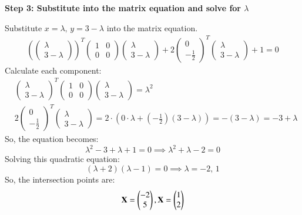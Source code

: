 \documentclass[journal,12pt,onecolumn]{IEEEtran}
\begin{document}
\textbf{Step 3: Substitute into the matrix equation and solve for \(\lambda\)}

Substitute \( x = \lambda,\, y = 3 - \lambda \) into the matrix equation.
\begin{align*}
\left(
\begin{pmatrix}
\lambda \\
3 - \lambda
\end{pmatrix}
\right)^T 
\begin{pmatrix}
1 & 0 \\
0 & 0
\end{pmatrix}
\begin{pmatrix}
\lambda \\
3 - \lambda
\end{pmatrix}
+ 2
\begin{pmatrix}
0 \\
-\frac{1}{2}
\end{pmatrix}^T 
\begin{pmatrix}
\lambda \\
3 - \lambda
\end{pmatrix}
+ 1 = 0
\end{align*}
Calculate each component:
\begin{align*}
& \begin{pmatrix}
\lambda \\
3 - \lambda
\end{pmatrix}^T 
\begin{pmatrix}
1 & 0 \\
0 & 0
\end{pmatrix}
\begin{pmatrix}
\lambda \\
3 - \lambda
\end{pmatrix}
= \lambda^2 \\
& 2\begin{pmatrix}
0 \\
-\frac{1}{2}
\end{pmatrix}^T 
\begin{pmatrix}
\lambda \\
3 - \lambda
\end{pmatrix}
= 2 \cdot \left(0 \cdot \lambda + \left(-\frac{1}{2}\right) (3 - \lambda) \right)
= - (3 - \lambda) = -3 + \lambda
\end{align*}
So, the equation becomes:
\[
\lambda^2 - 3 + \lambda + 1 = 0 
\implies \lambda^2 + \lambda - 2 = 0
\]
Solving this quadratic equation:
\[
(\lambda + 2)(\lambda - 1) = 0 \implies \lambda = -2,\, 1
\]
So, the intersection points are:
\[
\mathbf{X} = \begin{pmatrix}-2\\ 5\end{pmatrix} , \mathbf{X} = \begin{pmatrix}1\\2\end{pmatrix}
\]
\end{document}
